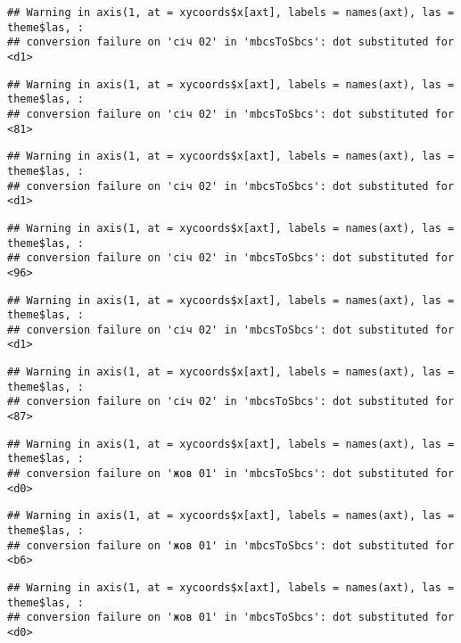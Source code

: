 \documentclass[]{article}
\begin{document}
\begin{verbatim}
## Warning in axis(1, at = xycoords$x[axt], labels = names(axt), las = theme$las, :
## conversion failure on 'січ 02' in 'mbcsToSbcs': dot substituted for <d1>
\end{verbatim}

\begin{verbatim}
## Warning in axis(1, at = xycoords$x[axt], labels = names(axt), las = theme$las, :
## conversion failure on 'січ 02' in 'mbcsToSbcs': dot substituted for <81>
\end{verbatim}

\begin{verbatim}
## Warning in axis(1, at = xycoords$x[axt], labels = names(axt), las = theme$las, :
## conversion failure on 'січ 02' in 'mbcsToSbcs': dot substituted for <d1>
\end{verbatim}

\begin{verbatim}
## Warning in axis(1, at = xycoords$x[axt], labels = names(axt), las = theme$las, :
## conversion failure on 'січ 02' in 'mbcsToSbcs': dot substituted for <96>
\end{verbatim}

\begin{verbatim}
## Warning in axis(1, at = xycoords$x[axt], labels = names(axt), las = theme$las, :
## conversion failure on 'січ 02' in 'mbcsToSbcs': dot substituted for <d1>
\end{verbatim}

\begin{verbatim}
## Warning in axis(1, at = xycoords$x[axt], labels = names(axt), las = theme$las, :
## conversion failure on 'січ 02' in 'mbcsToSbcs': dot substituted for <87>
\end{verbatim}

\begin{verbatim}
## Warning in axis(1, at = xycoords$x[axt], labels = names(axt), las = theme$las, :
## conversion failure on 'жов 01' in 'mbcsToSbcs': dot substituted for <d0>
\end{verbatim}

\begin{verbatim}
## Warning in axis(1, at = xycoords$x[axt], labels = names(axt), las = theme$las, :
## conversion failure on 'жов 01' in 'mbcsToSbcs': dot substituted for <b6>
\end{verbatim}

\begin{verbatim}
## Warning in axis(1, at = xycoords$x[axt], labels = names(axt), las = theme$las, :
## conversion failure on 'жов 01' in 'mbcsToSbcs': dot substituted for <d0>
\end{verbatim}
\end{document}

